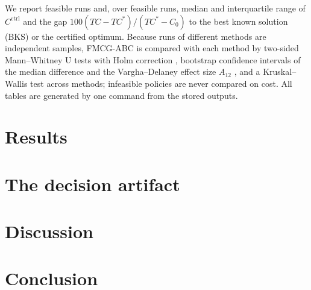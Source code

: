 \documentclass[preprint,12pt,authoryear]{elsarticle}
\newcommand{\Cctrl}{C^{\mathrm{ctrl}}}
\newif\ifrealdata
\begin{document}
We report feasible runs and, over feasible runs, median and interquartile range of $\Cctrl$ and the gap $100(TC-TC^*)/(TC^*-C_0)$ to the best known solution (BKS) or the certified optimum. Because runs of different methods are independent samples, FMCG-ABC is compared with each method by two-sided Mann--Whitney U tests \citep{MannWhitney1947} with Holm correction \citep{Holm1979}, bootstrap confidence intervals of the median difference and the Vargha--Delaney effect size $A_{12}$ \citep{VarghaDelaney2000}, and a Kruskal--Wallis test \citep{KruskalWallis1952} across methods; infeasible policies are never compared on cost. All tables are generated by one command from the stored outputs.

\section{Results}\label{sec:results}


\section{The decision artifact}\label{sec:artifact}


\ifrealdata
\section{Application to a distributor's portfolio}\label{sec:real}

\fi

\section{Discussion}\label{sec:discussion}


\section{Conclusion}\label{sec:conclusion}

\end{document}
